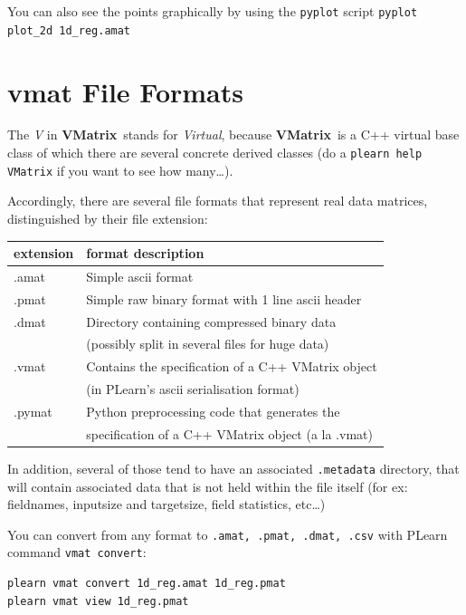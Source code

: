 \documentclass[11pt]{book}
\newcommand{\VMatrix}{{\bf VMatrix}~}
\begin{document}
You can also see the points graphically by using the \verb!pyplot! script
\verb!pyplot plot_2d 1d_reg.amat!

\section{vmat File Formats}

The {\em V} in \VMatrix stands for {\em Virtual}, because \VMatrix is a C++ virtual
base class of which there are several concrete derived classes (do a
\verb!plearn help VMatrix! if you want to see how many\ldots).

Accordingly, there are several file formats that represent real data
matrices, distinguished by their file extension:

\begin{center}
\begin{tabular}{|l|l|} \hline 
{\bf extension} & {\bf format description} \\ \hline
.amat           & Simple ascii format  \\ \hline
.pmat           & Simple raw binary format with 1 line ascii header  \\ \hline
.dmat           & Directory containing compressed binary data        \\
                & (possibly split in several files for huge data)    \\ \hline
.vmat           & Contains the specification of a C++ VMatrix object \\ 
                & (in PLearn's ascii serialisation format)           \\ \hline
.pymat          & Python preprocessing code that generates the       \\ 
                & specification of a C++ VMatrix object (a la .vmat) \\ \hline
\end{tabular}
\end{center}

In addition, several of those tend to have an associated {\tt .metadata}
directory, that will contain associated data that is not held within the
file itself (for ex: fieldnames, inputsize and targetsize, field statistics, etc\ldots)

You can convert from any format to {\tt .amat, .pmat, .dmat, .csv} with PLearn
command {\tt vmat convert}:
\begin{verbatim}
plearn vmat convert 1d_reg.amat 1d_reg.pmat
plearn vmat view 1d_reg.pmat
\end{verbatim}
\end{document}
